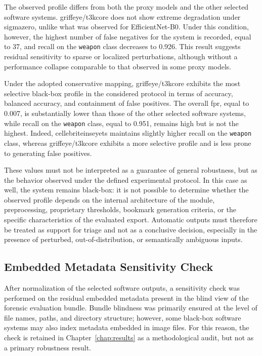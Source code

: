 The observed profile differs from both the proxy models and the other selected
software systems. \gls{griffeye}/\gls{t3kcore} does not show extreme
degradation under \gls{sigmazero}, unlike what was observed for EfficientNet-B0.
Under this condition, however, the highest number of false negatives for the
system is recorded, equal to 37, and recall on the \texttt{weapon} class
decreases to 0.926. This result suggests residual sensitivity to sparse or
localized perturbations, although without a performance collapse comparable to
that observed in some proxy models.

Under the adopted conservative mapping, \gls{griffeye}/\gls{t3kcore} exhibits
the most selective black-box profile in the considered protocol in terms of
accuracy, balanced accuracy, and containment of false positives.
The overall \gls{fpr}, equal to 0.007, is substantially lower than those of the
other selected software systems, while recall on the \texttt{weapon} class,
equal to 0.951, remains high but is not the highest. Indeed, \gls{cellebriteinseyets} maintains slightly higher recall on
the \texttt{weapon} class, whereas \gls{griffeye}/\gls{t3kcore} exhibits a more
selective profile and is less prone to generating false positives.

These values must not be interpreted as a guarantee of general robustness, but
as the behavior observed under the defined experimental protocol. In this case
as well, the system remains black-box: it is not possible to determine whether
the observed profile depends on the internal architecture of the module,
preprocessing, proprietary thresholds, bookmark generation criteria, or the
specific characteristics of the evaluated export. Automatic outputs must
therefore be treated as support for triage and not as a conclusive decision,
especially in the presence of perturbed, out-of-distribution, or semantically
ambiguous inputs.

\subsection{Embedded Metadata Sensitivity Check}
\label{subsec:results-embedded-metadata-sensitivity}

After normalization of the selected software outputs, a sensitivity check was
performed on the residual embedded metadata present in the blind view of the
forensic evaluation bundle. Bundle blindness was primarily ensured at the level
of file names, paths, and directory structure; however, some black-box software
systems may also index metadata embedded in image files. For this reason, the
check is retained in Chapter~\ref{chap:results} as a methodological audit, but
not as a primary robustness result.

